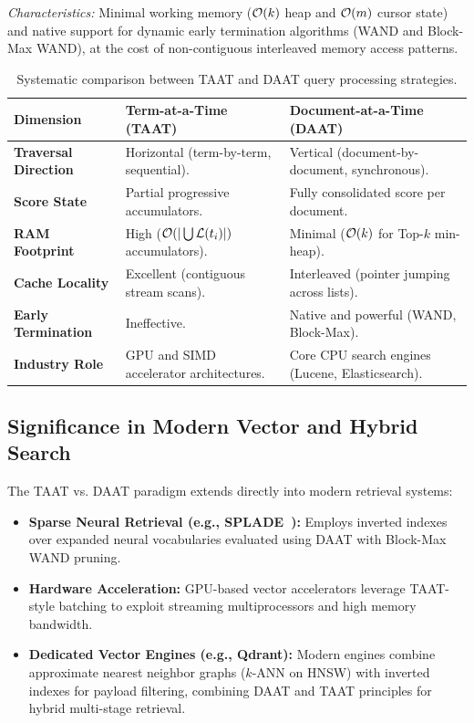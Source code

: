 \textit{Characteristics:} Minimal working memory ($\mathcal{O}\!\left(k\right)$ heap and $\mathcal{O}\!\left(m\right)$ cursor state) and native support for dynamic early termination algorithms (WAND and Block-Max WAND), at the cost of non-contiguous interleaved memory access patterns.

\begin{table}[H]
\centering
\small
\begin{tabularx}{\linewidth}{l >{\raggedright\arraybackslash}X >{\raggedright\arraybackslash}X}
\toprule
\textbf{Dimension} & \textbf{Term-at-a-Time (TAAT)} & \textbf{Document-at-a-Time (DAAT)} \\
\midrule
\textbf{Traversal Direction} & Horizontal (term-by-term, sequential). & Vertical (document-by-document, synchronous). \\
\addlinespace
\textbf{Score State} & Partial progressive accumulators. & Fully consolidated score per document. \\
\addlinespace
\textbf{RAM Footprint} & High ($\mathcal{O}\!\left(|\bigcup \mathcal{L}(t_i)|\right)$ accumulators). & Minimal ($\mathcal{O}\!\left(k\right)$ for Top-$k$ min-heap). \\
\addlinespace
\textbf{Cache Locality} & Excellent (contiguous stream scans). & Interleaved (pointer jumping across lists). \\
\addlinespace
\textbf{Early Termination} & Ineffective. & Native and powerful (WAND, Block-Max). \\
\addlinespace
\textbf{Industry Role} & GPU and SIMD accelerator architectures. & Core CPU search engines (Lucene, Elasticsearch). \\
\bottomrule
\end{tabularx}
\caption{Systematic comparison between TAAT and DAAT query processing strategies.}
\label{tab:taat-vs-daat-summary-en}
\end{table}

\subsection{Significance in Modern Vector and Hybrid Search}
The TAAT vs. DAAT paradigm extends directly into modern retrieval systems:
\begin{itemize}
    \item \textbf{Sparse Neural Retrieval (e.g., SPLADE~\cite{formal2021}):} Employs inverted indexes over expanded neural vocabularies evaluated using DAAT with Block-Max WAND pruning.
    \item \textbf{Hardware Acceleration:} GPU-based vector accelerators leverage TAAT-style batching to exploit streaming multiprocessors and high memory bandwidth.
    \item \textbf{Dedicated Vector Engines (e.g., Qdrant):} Modern engines combine approximate nearest neighbor graphs ($k$-ANN on HNSW) with inverted indexes for payload filtering, combining DAAT and TAAT principles for hybrid multi-stage retrieval.
\end{itemize}
